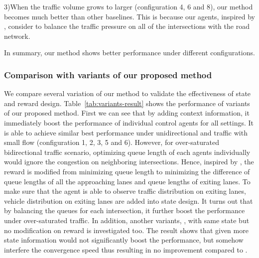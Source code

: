 3)When the traffic volume grows to larger (configuration 4, 6 and 8), our method becomes much better than other baselines. This is because our agents, inspired by \Maxpressure, consider to balance the traffic pressure on all of the intersections with the road network.

In summary, our method \PressLight shows better performance under different configurations.



\subsubsection{Comparison with variants of our proposed method}  
We compare several variation of our method to validate the effectiveness of state and reward design. Table~\ref{tab:variants-result} shows the performance of variants of our proposed method. First we can see that by adding context information, it immediately boost the performance of individual control agents for all settings. It is able to achieve similar best performance under unidirectional and traffic with small flow (configuration 1, 2, 3, 5 and 6). However, for over-saturated bidirectional traffic scenario, optimizing queue length of each agents individually would ignore the congestion on neighboring intersections. Hence, inspired by \Maxpressure, the reward is modified from minimizing queue length to minimizing the difference of queue lengths of all the approaching lanes and queue lengths of exiting lanes. To make sure that the agent is able to observe traffic distribution on exiting lanes, vehicle distribution on exiting lanes are added into state design. It turns out that by balancing the queues for each intersection, it further boost the performance under over-saturated traffic. In addition, another variants, \SNDeeplight, with same state but no modification on reward is investigated too. The result shows that given more state information would not significantly boost the performance, but somehow interfere the convergence speed thus resulting in no improvement compared to \SDeeplight.

